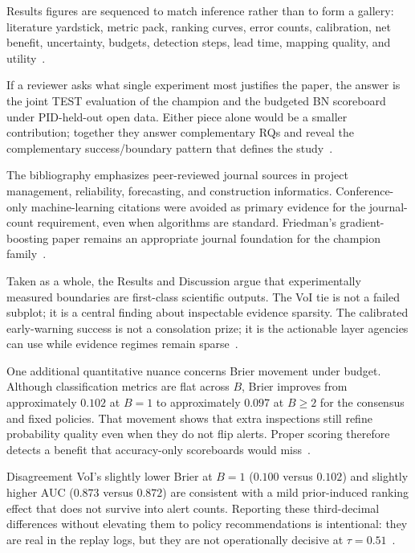Results figures are sequenced to match inference rather than to form a gallery: literature yardstick, metric pack, ranking curves, error counts, calibration, net benefit, uncertainty, budgets, detection steps, lead time, mapping quality, and utility~\cite{Saito2015,Vickers2006}.

If a reviewer asks what single experiment most justifies the paper, the answer is the joint TEST evaluation of the champion and the budgeted BN scoreboard under PID-held-out open data. Either piece alone would be a smaller contribution; together they answer complementary RQs and reveal the complementary success/boundary pattern that defines the study~\cite{Luu2009,Howard1966,Egwim2021}.

The bibliography emphasizes peer-reviewed journal sources in project management, reliability, forecasting, and construction informatics. Conference-only machine-learning citations were avoided as primary evidence for the journal-count requirement, even when algorithms are standard. Friedman’s gradient-boosting paper remains an appropriate journal foundation for the champion family~\cite{Friedman2001}.

Taken as a whole, the Results and Discussion argue that experimentally measured boundaries are first-class scientific outputs. The VoI tie is not a failed subplot; it is a central finding about inspectable evidence sparsity. The calibrated early-warning success is not a consolation prize; it is the actionable layer agencies can use while evidence regimes remain sparse~\cite{Song2021,Gneiting2007,Tagharobi2025}.

One additional quantitative nuance concerns Brier movement under budget. Although classification metrics are flat across $B$, Brier improves from approximately $0.102$ at $B{=}1$ to approximately $0.097$ at $B{\geq}2$ for the consensus and fixed policies. That movement shows that extra inspections still refine probability quality even when they do not flip alerts. Proper scoring therefore detects a benefit that accuracy-only scoreboards would miss~\cite{Brier1950,Murphy1973,Gneiting2007}.

Disagreement VoI's slightly lower Brier at $B{=}1$ ($0.100$ versus $0.102$) and slightly higher AUC ($0.873$ versus $0.872$) are consistent with a mild prior-induced ranking effect that does not survive into alert counts. Reporting these third-decimal differences without elevating them to policy recommendations is intentional: they are real in the replay logs, but they are not operationally decisive at $\tau{=}0.51$~\cite{Song2021,Memarzadeh2016}.

